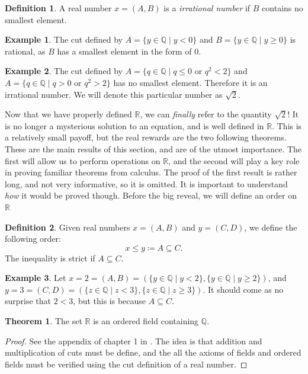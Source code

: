 \documentclass{article}
\newcommand{\R}{\mathbb{R}}
\newcommand{\Q}{\mathbb{Q}}
\theoremstyle{definition}
\newtheorem{theorem}{Theorem}[section]
\newtheorem{definition}{Definition}[section]
\newtheorem{example}{Example}[section]
\begin{document}
\begin{definition}
	A real number $ x=(A,B) $ is a \textit{\color{red}irrational number} if $ B $ contains no smallest element.
\end{definition}
\begin{example}
	The cut defined by $ A=\{y\in \Q \mid y<0\} $ and $ B=\{y\in\Q\mid y\ge 0\} $ is rational, as $ B $ has a smallest element in the form of $ 0 $.  
\end{example}
\begin{example}
	The cut defined by $A=\{q\in\Q\mid q\le 0\text{ or }q^2<2 \} $ and $ A=\{q\in\Q\mid q> 0\text{ or }q^2>2 \} $ has no smallest element. Therefore it is an irrational number. We will denote this particular number as $ \sqrt{2} $. 
\end{example}
Now that we have properly defined $ \R $, we can \textit{finally} refer to the quantity $ \sqrt{2} $! It is no longer a mysterious solution to an equation, and is well defined in $ \R $. This is a relatively small payoff, but the real rewards are the two following theorems. These are the main results of this section, and are of the utmost importance. The first will allow us to perform operations on $ \R $, and the second will play a key role in proving familiar theorems from calculus. The proof of the first result is rather long, and not very informative, so it is omitted. It is important to understand \textit{how} it would be proved though. Before the big reveal, we will define an order on $ \R $
\begin{definition}
	Given real numbers $ x=(A,B) $ and $ y=(C,D) $, we define the following order:$$x\le y\coloneqq A\subseteq C .$$ The inequality is strict if $ A\subseteq C $. 
\end{definition}
\begin{example}
	Let $ x=2=(A,B)=(\{y\in \Q \mid y<2\},\{y\in\Q\mid y\ge 2\})$, and $ y=3=(C,D)=(\{z\in \Q \mid z<3\},\{z\in\Q\mid z\ge 3\})$. It should come as no surprise that $ 2<3 $, but this is because $ A\subseteq C $.  
\end{example}
\begin{theorem}
	The set $ \R $ is an ordered field containing $ \Q $.
\end{theorem}
\begin{proof}
	See the appendix of chapter 1 in \cite{rudin1964principles}. The idea is that addition and multiplication of cuts must be define, and the all the axioms of fields and ordered fields must be verified using the cut definition of a real number. 
\end{proof}
\end{document}
